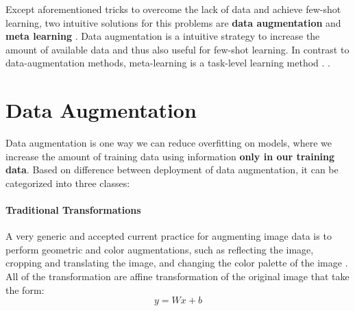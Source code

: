 \documentclass{article}
\begin{document}


Except aforementioned tricks to overcome the lack of data and achieve few-shot learning, two intuitive solutions for this problems are \textbf{data augmentation} and \textbf{meta learning} \cite{sun2018meta}. Data augmentation is a intuitive strategy to increase the amount of available data and thus also useful for few-shot learning. In contrast to data-augmentation methods, meta-learning is a task-level learning method \cite{thrun2012learning}. {}.

\section{Data Augmentation}

Data augmentation is one way we can reduce overfitting on models, where we increase the amount of training data using information \textbf{only in our training data}. Based on difference between deployment of data augmentation, it can be categorized into three classes:

\paragraph{Traditional Transformations} A very generic and accepted current practice for augmenting image data is to perform geometric and color augmentations, such as reflecting the image, cropping and translating the image, and changing the color palette of the image \cite{krizhevsky2012imagenet}. All of the transformation are affine transformation of the original image that take the form:
\[
y=Wx+b
\]
\end{document}
